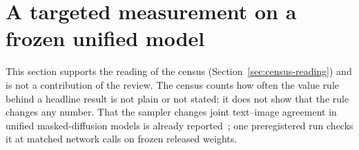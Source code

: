 \section{A targeted measurement on a frozen unified model}
\label{sec:exp003}

This section supports the reading of the census (Section~\ref{sec:census-reading}) and is not a contribution of the review. The census counts how often the value rule behind a headline result is not plain or not stated; it does not show that the rule changes any number. That the sampler changes joint text--image agreement in unified masked-diffusion models is already reported~\cite{arXiv:2607.13188,arXiv:2511.09611,arXiv:2503.20853}; one preregistered run checks it at matched network calls on frozen released weights. %

